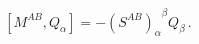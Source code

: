 \begin{equation}
\left[ M^{AB}, Q_\alpha\right]=-{(S^{AB})_\alpha}^\beta Q_\beta\,.
\end{equation}

